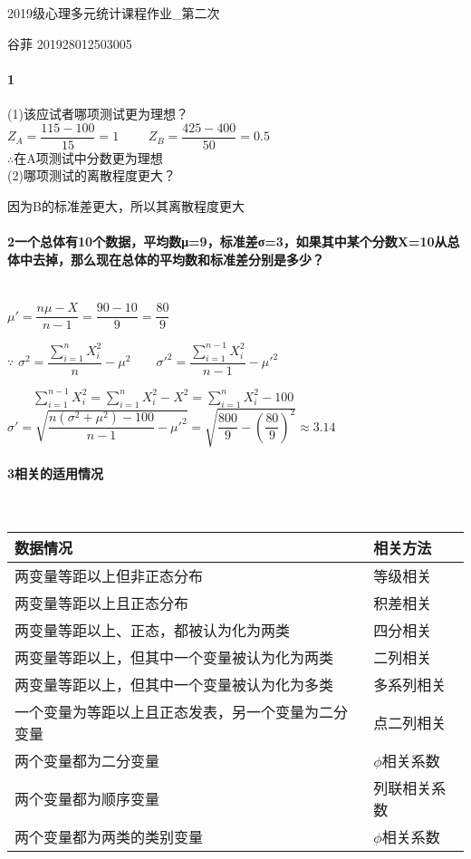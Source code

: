 \documentclass[UTF8]{ctexart}
\begin{document}
\begin{center}
	\LARGE
	2019级心理多元统计课程作业\_第二次

	\normalsize
	谷菲 201928012503005
\end{center}

\paragraph{1}(1)该应试者哪项测试更为理想？
~\\

$Z_A=\dfrac{115-100}{15}=1  \qquad $
$Z_B=\dfrac{425-400}{50}=0.5$
~\\

$\therefore$在A项测试中分数更为理想
~\\

(2)哪项测试的离散程度更大？ 

因为B的标准差更大，所以其离散程度更大

\paragraph{2一个总体有10个数据，平均数μ=9，标准差σ=3，如果其中某个分数X=10从总体中去掉，那么现在总体的平均数和标准差分别是多少？}
~\\


$\mu'=\dfrac{n\mu-X}{n-1}=\dfrac{90-10}{9}=\dfrac{80}{9}$
	
$\because $
$
\sigma^2=\dfrac{\displaystyle \sum_{i=1}^{n}X_i^2}{n}-\mu^2
\qquad 
\sigma'^2=\dfrac{\displaystyle \sum_{i=1}^{n-1}X_i^2}{n-1}-\mu'^2
$

$ \qquad \displaystyle\sum_{i=1}^{n-1}X_i^2=\sum_{i=1}^{n}X_i^2-X^2=\sum_{i=1}^{n}X_i^2-100$
~\\

$\sigma'=\sqrt{\dfrac{n(\sigma^2+\mu^2)-100}{n-1}-\mu'^2}=\sqrt{\dfrac{800}{9}-(\dfrac{80}{9})^2}\approx3.14$

\paragraph{3相关的适用情况}
~\\

\begin{tabular}{ll}
	\toprule
	数据情况 & 相关方法 \\
	\midrule
	两变量等距以上但非正态分布 & 等级相关           \\
	两变量等距以上且正态分布     & 积差相关      \\
	两变量等距以上、正态，都被认为化为两类   & 四分相关\\
	两变量等距以上，但其中一个变量被认为化为两类   &二列相关\\
	两变量等距以上，但其中一个变量被认为化为多类	&多系列相关\\
	一个变量为等距以上且正态发表，另一个变量为二分变量	&点二列相关\\
	两个变量都为二分变量	&$\phi$相关系数\\
	两个变量都为顺序变量	&列联相关系数\\
	两个变量都为两类的类别变量 &$\phi$相关系数\\
	\bottomrule
\end{tabular}
\newpage
\end{document}
